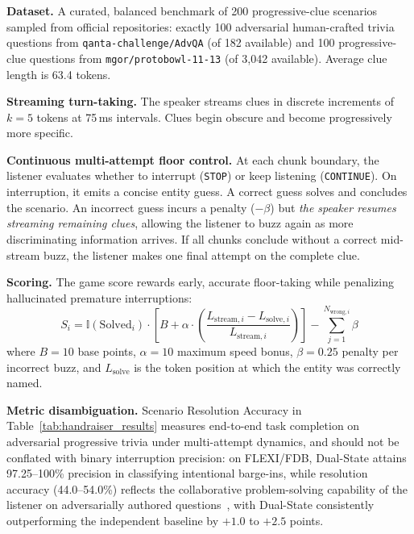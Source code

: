 \documentclass{article}
\begin{document}
\textbf{Dataset.} A curated, balanced benchmark of 200 progressive-clue scenarios sampled from official repositories: exactly 100 adversarial human-crafted trivia questions from \texttt{qanta-challenge/AdvQA} (of 182 available) and 100 progressive-clue questions from \texttt{mgor/protobowl-11-13} (of 3{,}042 available). Average clue length is 63.4 tokens.

\textbf{Streaming turn-taking.} The speaker streams clues in discrete increments of $k=5$ tokens at 75\,ms intervals. Clues begin obscure and become progressively more specific.

\textbf{Continuous multi-attempt floor control.} At each chunk boundary, the listener evaluates whether to interrupt (\texttt{STOP}) or keep listening (\texttt{CONTINUE}). On interruption, it emits a concise entity guess. A correct guess solves and concludes the scenario. An incorrect guess incurs a penalty ($-\beta$) but \emph{the speaker resumes streaming remaining clues}, allowing the listener to buzz again as more discriminating information arrives. If all chunks conclude without a correct mid-stream buzz, the listener makes one final attempt on the complete clue.

\textbf{Scoring.} The game score rewards early, accurate floor-taking while penalizing hallucinated premature interruptions:
\begin{equation}
S_i = \mathbb{I}(\text{Solved}_i) \cdot \left[ B + \alpha \cdot \left(\frac{L_{\text{stream}, i} - L_{\text{solve}, i}}{L_{\text{stream}, i}}\right) \right] - \sum_{j=1}^{N_{\text{wrong}, i}} \beta
\label{eq:game_score}
\end{equation}
where $B = 10$ base points, $\alpha = 10$ maximum speed bonus, $\beta = 0.25$ penalty per incorrect buzz, and $L_{\text{solve}}$ is the token position at which the entity was correctly named.

\textbf{Metric disambiguation.} Scenario Resolution Accuracy in Table~\ref{tab:handraiser_results} measures end-to-end task completion on adversarial progressive trivia under multi-attempt dynamics, and should not be conflated with binary interruption precision: on FLEXI/FDB, Dual-State attains 97.25--100\% precision in classifying intentional barge-ins, while resolution accuracy (44.0--54.0\%) reflects the collaborative problem-solving capability of the listener on adversarially authored questions~\citep{wallace2019trick}, with Dual-State consistently outperforming the independent baseline by $+1.0$ to $+2.5$ points.
\end{document}

